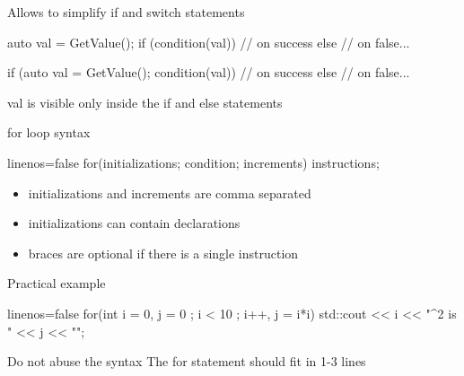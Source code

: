 \begin{frame}[fragile]
  Allows to simplify if and switch statements
  \begin{alertblock}{}
    \begin{cppcode*}{}
      auto val = GetValue();
      if (condition(val)) {
        // on success
      } else {
        // on false...
      }
    \end{cppcode*}
  \end{alertblock}
  \begin{exampleblock}{}
    \begin{cppcode*}{}
      if (auto val = GetValue(); condition(val)) {
        // on success
      } else {
        // on false...
      }
    \end{cppcode*}
    \vspace{-.3cm}
    val is visible only inside the if and else statements
  \end{exampleblock}  
\end{frame}

\begin{frame}[fragile]
  \begin{block}{for loop syntax}
    \begin{cppcode*}{linenos=false}
      for(initializations; condition; increments) {
        instructions;
      }
    \end{cppcode*}
    \vspace{-0.5cm}
    \begin{itemize}
      \item initializations and increments are comma separated
      \item initializations can contain declarations
      \item braces are optional if there is a single instruction
    \end{itemize}
  \end{block}
  \pause
  \begin{exampleblock}{Practical example}
    \begin{cppcode*}{linenos=false}
      for(int i = 0, j = 0 ; i < 10 ; i++, j = i*i) {
        std::cout << i << "^2 is " << j << "\n";
      }
    \end{cppcode*}
  \end{exampleblock}
  \pause
  \begin{alertblock}{Do not abuse the syntax}
    The for statement should fit in 1-3 lines
  \end{alertblock}
\end{frame}

